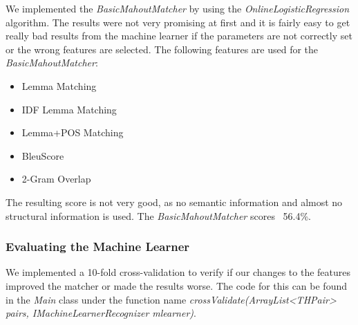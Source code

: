 We implemented the \textit{BasicMahoutMatcher} by using
the \textit{OnlineLogisticRegression} algorithm. The results were not very promising at first and it is fairly easy to
get really bad results from the machine learner if the parameters are not correctly set or the wrong features are
selected. The following features are used for the \textit{BasicMahoutMatcher}:

\begin{itemize}
    \item Lemma Matching
    \item IDF Lemma Matching
    \item Lemma+POS Matching
    \item BleuScore
    \item 2-Gram Overlap
\end{itemize}

The resulting score is not very good, as no semantic information and almost no structural information is used. The
\textit{BasicMahoutMatcher} scores ~56.4\%.

\subsubsection{Evaluating the Machine Learner}
We implemented a 10-fold cross-validation to verify if our changes to the features improved the matcher or made the
results worse. The code for this can be found in the \textit{Main} class under the function name
\textit{crossValidate(ArrayList<THPair> pairs, IMachineLearnerRecognizer mlearner)}.


